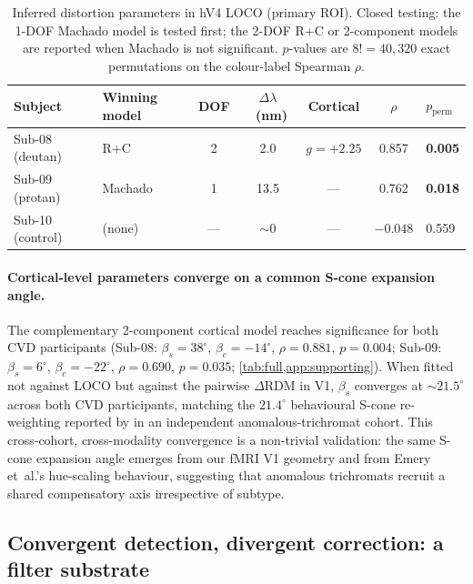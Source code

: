 \begin{table}[tb]
  \caption{Inferred distortion parameters in hV4 LOCO (primary ROI).
  Closed testing: the 1-DOF Machado model is tested first; the 2-DOF
  R+C or 2-component models are reported when Machado is not
  significant. $p$-values are $8! = 40{,}320$ exact permutations on
  the colour-label Spearman $\rho$.}
  \label{tab:main}
  \centering
  \small
  \begin{tabular}{llccccl}
    \toprule
    Subject & Winning model & DOF &
    $\Delta\lambda$~(nm) &
    Cortical & $\rho$ & $p_{\text{perm}}$ \\
    \midrule
    Sub-08 (deutan)   & R+C       & 2 & 2.0  & $g = +2.25$                         & 0.857 & \textbf{0.005} \\
    Sub-09 (protan)   & Machado   & 1 & 13.5 & ---                                 & 0.762 & \textbf{0.018} \\
    Sub-10 (control)  & (none)    & --- & $\sim$0 & ---                            & $-0.048$ & 0.559 \\
    \bottomrule
  \end{tabular}
\end{table}

\paragraph{Cortical-level parameters converge on a common S-cone
expansion angle.}
The complementary 2-component cortical model reaches significance for
both CVD participants (Sub-08: $\beta_s = 38^\circ$, $\beta_c = -14^\circ$,
$\rho = 0.881$, $p = 0.004$; Sub-09: $\beta_s = 6^\circ$,
$\beta_c = -22^\circ$, $\rho = 0.690$, $p = 0.035$;
\cref{tab:full,app:supporting}). When fitted not against LOCO but
against the pairwise $\Delta$RDM in V1, $\beta_s$ converges at
$\sim 21.5^\circ$ across both CVD participants, matching the
$21.4^\circ$ behavioural S-cone re-weighting reported by
\citet{emery2021} in an independent anomalous-trichromat cohort. This
cross-cohort, cross-modality convergence is a non-trivial validation:
the same S-cone expansion angle emerges from our fMRI V1 geometry and
from Emery et~al.'s hue-scaling behaviour, suggesting that anomalous
trichromats recruit a shared compensatory axis irrespective of subtype.

\subsection{Convergent detection, divergent correction: a filter
substrate}
\label{sec:results:filter}

